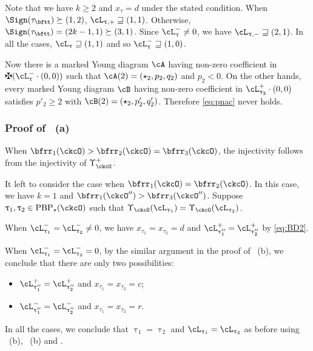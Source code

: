 \documentclass[12pt,a4paper]{amsart}
\numberwithin{equation}{section}
\theoremstyle{remark}
\def\PBPes{\mathrm{PBP}^{\mathrm{ext}}_{\star}}
\def\PBP{\mathrm{PBP}}
\begin{document}
  Note that we have $k\geq 2$ and $x_{\tau}=d$ under the stated condition.
  When $\Sign( {\tau}_{\bftt} )\succeq (1,2)$, $\ppac{\uptau}\sqsupseteq (1,1)$.
  Otherwise, $\Sign( \tau_{\bftt} ) = (2k-1,1)\succeq (3,1)$.
  Since $\nac{\uptau}\neq 0$, we have $\nnac{\uptau}\sqsupseteq (2,1)$. 
  In all the cases,  $\ac_{\uptau}\sqsupseteq (1,1)$ and so
  $\nac{\uptau}\sqsupseteq (1,0)$.

  Now there is a marked Young diagram $\cA$ having non-zero coefficient in
  $\maltese (\nac{\uptau}\cdot (0,0))$ such that $\cA(2) = (\star_2, p_2, q_2)$
  and $p_2<0$. 
  On the other hands, every marked Young diagram $\cB$ having 
  non-zero coefficient in $\pac{\uptau_2}\cdot(0,0)$ satisfies $p'_2\geq 2$ 
  with $\cB(2) = (\star_2, p'_2,q'_2)$. 
  Therefore \eqref{eq:pnac} never holds. 


\subsubsection*{Proof of ~(a)}

When $\bfrr_{1}(\ckcO)>\bfrr_{2}(\ckcO)=\bfrr_{3}(\ckcO)$, the injectivity
follows from the injectivity of $\Upsilon_{\ckcO}^{+}$.

It left to consider the case when $\bfrr_{1}(\ckcO)=\bfrr_{2}(\ckcO)$.
In this case, we have $k=1$ and $\bfrr_{1}(\ckcO'')>\bfrr_{3}(\ckcO'')$.
Suppose $\uptau_1, \uptau_2\in \PBP_{\star}(\ckcO)$ such that
$\Upsilon_{\ckcO}(\ac_{\uptau_{1}}) = \Upsilon_{\ckcO}(\ac_{\uptau_{2}})$.

When $\nac{\uptau_{1}}=\nac{\uptau_{2}}  \neq 0$, we have $x_{\tau_{1}}=x_{\tau_{2}}=d$ and
$\pac{\uptau''_{1}} = \pac{\uptau''_{2}}$ by \eqref{eq:BD2}.

When $\nac{\uptau_{1}}=\nac{\uptau_{2}}=0$, by the similar argument in the proof of ~(b),
we conclude that there are only two possibilities:
\begin{itemize}
  \item $\pac{\uptau''_{1}} = \pac{\uptau''_{2}}$ and
  $x_{\tau_{1}}=x_{\tau_{2}} = c$;
  \item $\nac{\uptau''_{1}} = \nac{\uptau''_{2}}$ and
  $x_{\tau_{1}}=x_{\tau_{2}} = r$.
\end{itemize}

In all the cases,  
we conclude that $\uptau_1=\uptau_2$ and $\ac_{\uptau_1} = \ac_{\uptau_2}$
as before using ~(b), ~(b) and . 
\end{document}
